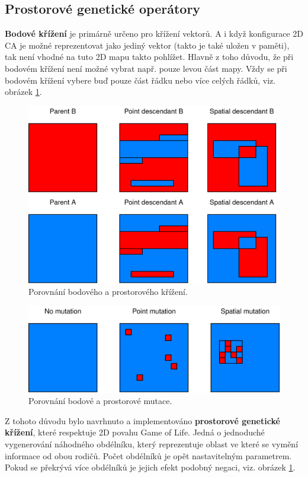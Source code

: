 \documentclass[12pt]{article}
\begin{document}
\subsection{Prostorové genetické operátory}
\textbf{Bodové křížení} je primárně určeno pro křížení vektorů. A i když konfigurace 2D CA je možné reprezentovat jako jediný vektor (takto je také uložen v paměti), tak není vhodné na tuto 2D mapu takto pohlížet. Hlavně z toho důvodu, že při bodovém křížení není možné vybrat např. pouze levou část mapy. Vždy se při bodovém křížení vybere buď pouze část řádku nebo více celých řádků, viz. obrázek \ref{cross}. 

\begin{figure}
    \centering
    \includegraphics[width=0.6\paperwidth]{cross.png}
    \caption{Porovnání bodového a prostorového křížení.}
    \label{cross}
\end{figure}

\begin{figure}
    \centering
    \includegraphics[width=0.6\paperwidth]{mutation.png}
    \caption{Porovnání bodové a prostorové mutace.}
    \label{mutation}
\end{figure}

Z tohoto důvodu bylo navrhnuto a implementováno \textbf{prostorové genetické křížení}, které respektuje 2D povahu Game of Life. Jedná o jednoduché vygenerování náhodného obdélníku, který reprezentuje oblast ve které se vymění informace od obou rodičů. Počet obdélníků je opět nastavitelným parametrem. Pokud se překrývá více obdélníků je jejich efekt podobný negaci, viz. obrázek \ref{cross}.
\end{document}
